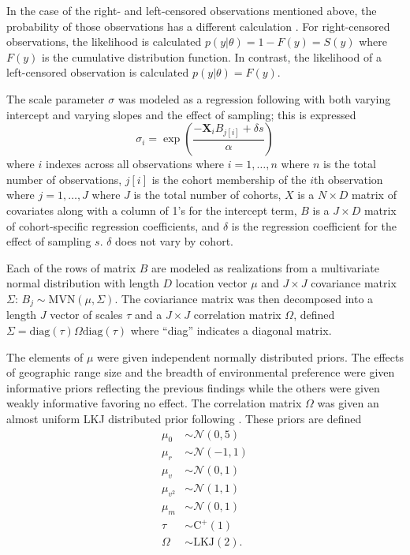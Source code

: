 \documentclass{article}
\begin{document}
In the case of the right- and left-censored observations mentioned above, the probability of those observations has a different calculation \citep{Klein2003}. For right-censored observations, the likelihood is calculated \(p(y | \theta) = 1 - F(y) = S(y)\) where \(F(y)\) is the cumulative distribution function. In contrast, the likelihood of a left-censored observation is calculated \(p(y | \theta) = F(y)\).

The scale parameter \(\sigma\) was modeled as a regression following \citet{Kleinbaum2005} with both varying intercept and varying slopes and the effect of sampling; this is expressed
\begin{equation}
  \sigma_{i} = \exp\left(\frac{-\mathbf{X}_{i} B_{j[i]} + \delta s}{\alpha}\right)
  \label{eq:sigma}
\end{equation}
where \(i\) indexes across all observations where \(i = 1, \dots, n\) where \(n\) is the total number of observations, \(j[i]\) is the cohort membership of the \(i\)th observation where \(j = 1, \dots, J\) where \(J\) is the total number of cohorts, \(X\) is a \(N \times D\) matrix of covariates along with a column of 1's for the intercept term, \(B\) is a \(J \times D\) matrix of cohort-specific regression coefficients, and \(\delta\) is the regression coefficient for the effect of sampling \(s\). \(\delta\) does not vary by cohort.

Each of the rows of matrix \(B\) are modeled as realizations from a multivariate normal distribution with length \(D\) location vector \(\mu\) and \(J \times J\) covariance matrix \(\Sigma\): \(B_{j} \sim \mathrm{MVN}(\mu, \Sigma)\). The coviariance matrix was then decomposed into a length \(J\) vector of scales \(\tau\) and a \(J \times J\) correlation matrix \(\Omega\), defined \(\Sigma = \mathrm{diag}(\tau) \Omega \mathrm{diag}(\tau)\) where ``diag'' indicates a diagonal matrix.

The elements of \(\mu\) were given independent normally distributed priors. The effects of geographic range size  and the breadth of environmental preference were given informative priors reflecting the previous findings while the others were given weakly informative favoring no effect. The correlation matrix \(\Omega\) was given an almost uniform LKJ distributed prior following \citep{Team2016}. These priors are defined
\begin{equation*}
  \begin{aligned}
    \mu_{0} &\sim \mathcal{N}(0, 5) \\
    \mu_{r} &\sim \mathcal{N}(-1, 1) \\
    \mu_{v} &\sim \mathcal{N}(0, 1) \\
    \mu_{v^{2}} &\sim \mathcal{N}(1, 1) \\
    \mu_{m} &\sim \mathcal{N}(0, 1) \\
    \tau &\sim \mathrm{C^{+}}(1) \\
    \Omega &\sim \text{LKJ}(2).
  \end{aligned}
  \label{eq:sigma_prior}
\end{equation*}
\end{document}
